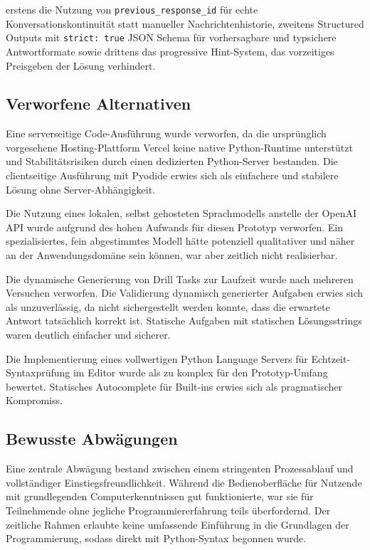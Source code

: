 erstens die Nutzung von \texttt{previous\_response\_id} für echte Konversationskontinuität statt manueller Nachrichtenhistorie, zweitens Structured Outputs mit \texttt{strict: true} JSON Schema für vorhersagbare und typsichere Antwortformate sowie drittens das progressive Hint-System, das vorzeitiges Preisgeben der Lösung verhindert.

\subsection{Verworfene Alternativen}

Eine serverseitige Code-Ausführung wurde verworfen, da die ursprünglich vorgesehene Hosting-Plattform Vercel keine native Python-Runtime unterstützt und Stabilitätsrisiken durch einen dedizierten Python-Server bestanden.
Die clientseitige Ausführung mit Pyodide erwies sich als einfachere und stabilere Lösung ohne Server-Abhängigkeit.

Die Nutzung eines lokalen, selbst gehosteten Sprachmodells anstelle der OpenAI API wurde aufgrund des hohen Aufwands für diesen Prototyp verworfen.
Ein spezialisiertes, fein abgestimmtes Modell hätte potenziell qualitativer und näher an der Anwendungsdomäne sein können, war aber zeitlich nicht realisierbar.

Die dynamische Generierung von Drill Tasks zur Laufzeit wurde nach mehreren Versuchen verworfen.
Die Validierung dynamisch generierter Aufgaben erwies sich als unzuverlässig, da nicht sichergestellt werden konnte, dass die erwartete Antwort tatsächlich korrekt ist.
Statische Aufgaben mit statischen Lösungsstrings waren deutlich einfacher und sicherer.

Die Implementierung eines vollwertigen Python Language Servers für Echtzeit-Syntaxprüfung im Editor wurde als zu komplex für den Prototyp-Umfang bewertet.
Statisches Autocomplete für Built-ins erwies sich als pragmatischer Kompromiss.

\subsection{Bewusste Abwägungen}

Eine zentrale Abwägung bestand zwischen einem stringenten Prozessablauf und vollständiger Einstiegsfreundlichkeit.
Während die Bedienoberfläche für Nutzende mit grundlegenden Computerkenntnissen gut funktionierte, war sie für Teilnehmende ohne jegliche Programmiererfahrung teils überfordernd.
Der zeitliche Rahmen erlaubte keine umfassende Einführung in die Grundlagen der Programmierung, sodass direkt mit Python-Syntax begonnen wurde.

